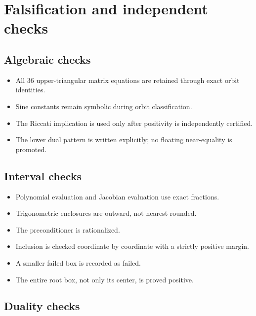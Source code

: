 \documentclass[11pt,a4paper,openany]{report}
\begin{document}
\chapter{Falsification and independent checks}

\section{Algebraic checks}

\begin{itemize}
\item 
All 36 upper-triangular matrix equations are retained through exact orbit identities.

\item 
Sine constants remain symbolic during orbit classification.

\item 
The Riccati implication is used only after positivity is independently certified.

\item 
The lower dual pattern is written explicitly; no floating near-equality is promoted.

\end{itemize}

\section{Interval checks}

\begin{itemize}
\item 
Polynomial evaluation and Jacobian evaluation use exact fractions.

\item 
Trigonometric enclosures are outward, not nearest rounded.

\item 
The preconditioner is rationalized.

\item 
Inclusion is checked coordinate by coordinate with a strictly positive margin.

\item 
A smaller failed box is recorded as failed.

\item 
The entire root box, not only its center, is proved positive.

\end{itemize}

\section{Duality checks}
\end{document}
